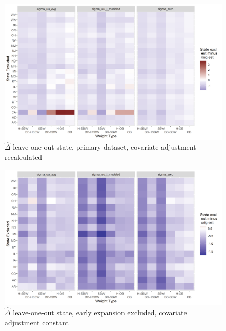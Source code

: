 \documentclass[12pt]{article}
\begin{document}
\begin{figure}[]
\begin{center}
    \includegraphics[scale=0.6]{01_Plots/loostate-repub-sensitivityc1-proc-full.png}
    \caption{$\hat{\Delta}$ leave-one-out state, primary dataset, covariate adjustment recalculated}
    \label{fig:rdiffc1proc}
\end{center}
\end{figure}

\begin{figure}[]
\begin{center}
    \includegraphics[scale=0.6]{01_Plots/loostate-repub-sensitivityc2-state-full.png}
    \caption{$\hat{\Delta}$ leave-one-out state, early expansion excluded, covariate adjustment constant}
    \label{fig:rdiffc2state}
\end{center}
\end{figure}
\end{document}
